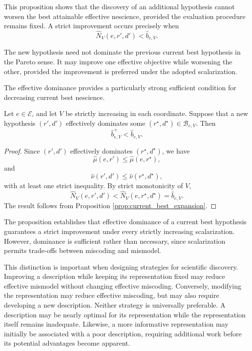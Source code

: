 This proposition shows that the discovery of an additional hypothesis cannot worsen the best attainable effective nescience, provided the evaluation procedure remains fixed. A strict improvement occurs precisely when
\[
\widehat N_V(e,r',d') < \widehat b_{e,V}.
\]

The new hypothesis need not dominate the previous current best hypothesis in the Pareto sense. It may improve one effective objective while worsening the other, provided the improvement is preferred under the adopted scalarization.

The effective dominance provides a particularly strong sufficient condition for decreasing current best nescience.

\begin{proposition}
\label{prop:current_best_strict_improvement}
Let $e\in\mathcal E$, and let $V$ be strictly increasing in each coordinate. Suppose that a new hypothesis $(r',d')$ effectively dominates some $(r^\star,d^\star)\in\mathcal B_{e,V}$. Then
\[
\widehat b_{e,V}^{+} < \widehat b_{e,V}.
\]
\end{proposition}
\begin{proof}
Since $(r',d')$ effectively dominates $(r^\star,d^\star)$, we have
\[
\widehat\mu(e,r') \leq \widehat\mu(e,r^\star),
\]
and
\[
\widehat\nu(r',d') \leq \widehat\nu(r^\star,d^\star),
\]
with at least one strict inequality. By strict monotonicity of $V$,
\[
\widehat N_V(e,r',d') < \widehat N_V(e,r^\star,d^\star) = \widehat b_{e,V}.
\]
The result follows from Proposition \ref{prop:current_best_expansion}.
\end{proof}

The proposition establishes that effective dominance of a current best hypothesis guarantees a strict improvement under every strictly increasing scalarization. However, dominance is sufficient rather than necessary, since scalarization permits trade-offs between miscoding and mismodel.

This distinction is important when designing strategies for scientific discovery. Improving a description while keeping its representation fixed may reduce effective mismodel without changing effective miscoding. Conversely, modifying the representation may reduce effective miscoding, but may also require developing a new description. Neither strategy is universally preferable. A description may be nearly optimal for its representation while the representation itself remains inadequate. Likewise, a more informative representation may initially be associated with a poor description, requiring additional work before its potential advantages become apparent.

